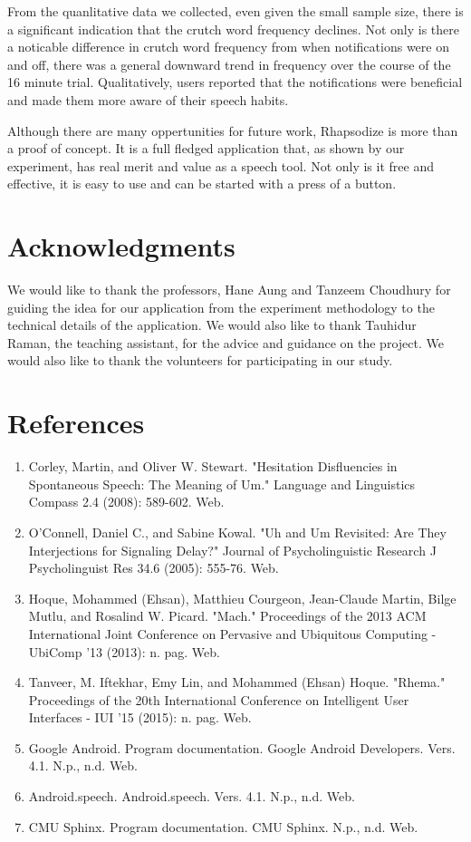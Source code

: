 \documentclass{sigchi}
\begin{document}
From the quanlitative data we collected, even given the small sample size, there is a significant indication that the crutch word frequency declines. Not only is there a noticable difference in crutch word frequency from when notifications were on and off, there was a general downward trend in frequency over the course of the 16 minute trial. Qualitatively, users reported that the notifications were beneficial and made them more aware of their speech habits. 

Although there are many oppertunities for future work, Rhapsodize is more than a proof of concept. It is a full fledged application that, as shown by our experiment, has real merit and value as a speech tool. Not only is it free and effective, it is easy to use and can be started with a press of a button. 

\section{Acknowledgments}

We would like to thank the professors, Hane Aung and Tanzeem Choudhury for guiding the idea for our application from the experiment methodology to the technical details of the application. We would also like to thank Tauhidur Raman, the teaching assistant, for the advice and guidance on the project. We would also like to thank the volunteers for participating in our study. 

\section{References}

\begin{enumerate}
\item Corley, Martin, and Oliver W. Stewart. "Hesitation Disfluencies in Spontaneous Speech: The Meaning of Um." Language and Linguistics Compass 2.4 (2008): 589-602. Web.
\item O’Connell, Daniel C., and Sabine Kowal. "Uh and Um Revisited: Are They Interjections for Signaling Delay?" Journal of Psycholinguistic Research J Psycholinguist Res 34.6 (2005): 555-76. Web.
\item Hoque, Mohammed (Ehsan), Matthieu Courgeon, Jean-Claude Martin, Bilge Mutlu, and Rosalind W. Picard. "Mach." Proceedings of the 2013 ACM International Joint Conference on Pervasive and Ubiquitous Computing - UbiComp '13 (2013): n. pag. Web.
\item Tanveer, M. Iftekhar, Emy Lin, and Mohammed (Ehsan) Hoque. "Rhema." Proceedings of the 20th International Conference on Intelligent User Interfaces - IUI '15 (2015): n. pag. Web.
\item Google Android. Program documentation. Google Android Developers. Vers. 4.1. N.p., n.d. Web.
\item Android.speech. Android.speech. Vers. 4.1. N.p., n.d. Web.
\item CMU Sphinx. Program documentation. CMU Sphinx. N.p., n.d. Web.
\end{enumerate}
\end{document}
